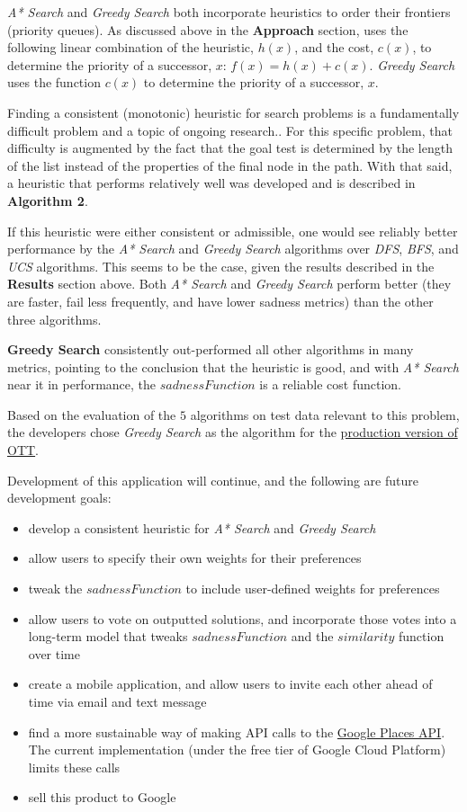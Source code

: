 \documentclass[11pt]{article}
\begin{document}
\textit{A* Search} and \textit{Greedy Search} both incorporate heuristics to order their frontiers (priority queues). As discussed above in the \textbf{Approach} section,  uses the following linear combination of the heuristic, $h(x)$, and the cost, $c(x)$, to determine the priority of a successor, $x$: $f(x) = h(x) + c(x)$. \textit{Greedy Search} uses the function $c(x)$ to determine the priority of a successor, $x$. 

Finding a consistent (monotonic) heuristic for search problems is a fundamentally difficult problem and a topic of ongoing research.\cite{heuristic}. For this specific problem, that difficulty is augmented by the fact that the goal test is determined by the length of the list instead of the properties of the final node in the path. With that said, a heuristic that performs relatively well was developed and is described in \textbf{Algorithm 2}.

If this heuristic were either consistent or admissible, one would see reliably better performance by the \textit{A* Search} and \textit{Greedy Search} algorithms over \textit{DFS}, \textit{BFS}, and \textit{UCS} algorithms. This seems to be the case, given the results described in the \textbf{Results} section above. Both \textit{A* Search} and \textit{Greedy Search} perform better (they are faster, fail less frequently, and have lower sadness metrics) than the other three algorithms.

\textbf{Greedy Search} consistently out-performed all other algorithms in many metrics, pointing to the conclusion that the heuristic is good, and with \textit{A* Search} near it in performance, the $sadnessFunction$ is a reliable cost function.

Based on the evaluation of the $5$ algorithms on test data relevant to this problem, the developers chose \textit{Greedy Search} as the algorithm for the \href{https://github.com/acamara1498/OTT}{production version of OTT}.

Development of this application will continue, and the following are future development goals:
\begin{itemize}
    \item develop a consistent heuristic for \textit{A* Search} and \textit{Greedy Search}
    \item allow users to specify their own weights for their preferences
    \item tweak the $sadnessFunction$ to include user-defined weights for preferences
    \item allow users to vote on outputted solutions, and incorporate those votes into a long-term model that tweaks $sadnessFunction$ and the $similarity$ function over time
    \item create a mobile application, and allow users to invite each other ahead of time via email and text message
    \item find a more sustainable way of making API calls to the \href{https://developers.google.com/places/web-service/intro}{Google Places API}. The current implementation (under the free tier of Google Cloud Platform) limits these calls
    \item sell this product to Google
\end{itemize}
\end{document}
